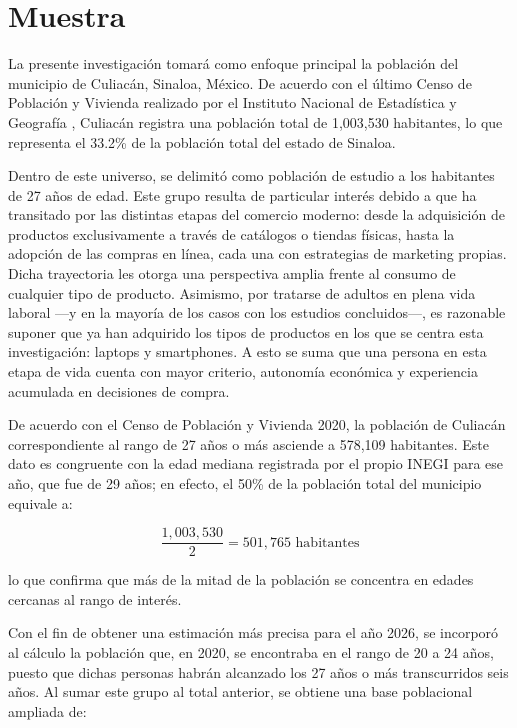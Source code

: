 \section{Muestra}

La presente investigación tomará como enfoque principal la población del municipio 
de Culiacán, Sinaloa, México. De acuerdo con el último Censo de Población y Vivienda 
realizado por el Instituto Nacional de Estadística y Geografía \parencite[p.~23]{inegi2021}, 
Culiacán registra una población total de 1,003,530 habitantes, lo que representa 
el 33.2\% de la población total del estado de Sinaloa.

Dentro de este universo, se delimitó como población de estudio a los habitantes de 27 
años de edad. Este grupo resulta de particular interés debido a que ha transitado por 
las distintas etapas del comercio moderno: desde la adquisición de productos exclusivamente 
a través de catálogos o tiendas físicas, hasta la adopción de las compras en línea, 
cada una con estrategias de marketing propias. Dicha trayectoria les otorga una perspectiva 
amplia frente al consumo de cualquier tipo de producto. Asimismo, por tratarse de adultos 
en plena vida laboral —y en la mayoría de los casos con los estudios concluidos—, es 
razonable suponer que ya han adquirido los tipos de productos en los que se centra 
esta investigación: laptops y smartphones. A esto se suma que una persona en esta 
etapa de vida cuenta con mayor criterio, autonomía económica y experiencia acumulada 
en decisiones de compra.

De acuerdo con el Censo de Población y Vivienda 2020, la población de Culiacán 
correspondiente al rango de 27 años o más asciende a 578,109 habitantes. Este dato 
es congruente con la edad mediana registrada por el propio INEGI para ese año, que 
fue de 29 años; en efecto, el 50\% de la población total del municipio equivale a:

\[
\frac{1{,}003{,}530}{2} = 501{,}765 \text{ habitantes}
\]

lo que confirma que más de la mitad de la población se concentra en edades cercanas 
al rango de interés.

Con el fin de obtener una estimación más precisa para el año 2026, se incorporó 
al cálculo la población que, en 2020, se encontraba en el rango de 20 a 24 años, 
puesto que dichas personas habrán alcanzado los 27 años o más transcurridos seis 
años. Al sumar este grupo al total anterior, se obtiene una base poblacional 
ampliada de:

